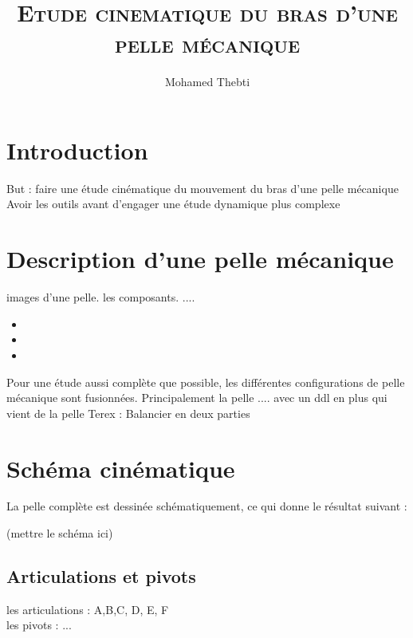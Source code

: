\documentclass[12pt,a4paper,twoside]{article}
\title{
	\Huge\textsc{Etude cinematique du bras d'une pelle mécanique}
}
\author{Mohamed Thebti}
\begin{document}
\setlength{\parindent}{0mm}

\fancyhead[R]{\slshape \leftmark}

\fancyfoot[C]{}
\fancyfoot[R]{\thepage}

\maketitle
\newpage

\tableofcontents

\newpage


\section{Introduction}

But : faire une étude cinématique du mouvement du bras d'une pelle mécanique
\medbreak
Avoir les outils avant d'engager une étude dynamique plus complexe 

\newpage
\section{Description d'une pelle mécanique}
images d'une pelle. les composants. ....
\begin{itemize}
	\item 
	\item 
	\item 
\end{itemize}

Pour une étude aussi complète que possible, les différentes configurations de pelle mécanique sont fusionnées. Principalement la pelle .... avec un ddl en plus qui vient de la pelle Terex : Balancier en deux parties 

\newpage
\section{Schéma cinématique}
La pelle complète est dessinée schématiquement, ce qui donne le résultat suivant : 

(mettre le schéma ici)
\subsection{Articulations et pivots}
les articulations : A,B,C, D, E, F\\
les pivots : ...\\
\end{document}
